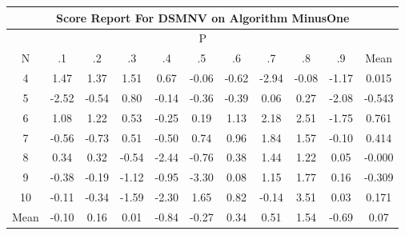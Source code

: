 \documentclass[11pt,a4paper]{report}
\begin{document}
\begin{longtable}{ | c || c | c | c | c | c | c | c | c | c || c |}
\hline
\multicolumn{11}{|c|}{ Score Report For DSMNV on Algorithm MinusOne} \\
\hline
\multicolumn{11}{|c|}{ P } \\
\hline
N & .1 & .2 & .3 & .4 & .5 & .6 & .7 & .8 & .9 & Mean\\
 \hline
 \hline
 \endhead
  4 &  \cellcolor[HTML]{D7D7FF} 1.47 &  \cellcolor[HTML]{DFDFFF} 1.37 &  \cellcolor[HTML]{D7D7FF} 1.51 &  \cellcolor[HTML]{EFEFFF} 0.67 &  \cellcolor[HTML]{FFFFFF} -0.06 &  \cellcolor[HTML]{FFEFEF} -0.62 &  \cellcolor[HTML]{FFB7B7} -2.94 &  \cellcolor[HTML]{FFFFFF} -0.08 &  \cellcolor[HTML]{FFDFDF} -1.17 & 0.015 \\
  5 &  \cellcolor[HTML]{FFBFBF} -2.52 &  \cellcolor[HTML]{FFEFEF} -0.54 &  \cellcolor[HTML]{E7E7FF} 0.80 &  \cellcolor[HTML]{FFFFFF} -0.14 &  \cellcolor[HTML]{FFF7F7} -0.36 &  \cellcolor[HTML]{FFF7F7} -0.39 &  \cellcolor[HTML]{FFFFFF} 0.06 &  \cellcolor[HTML]{F7F7FF} 0.27 &  \cellcolor[HTML]{FFC7C7} -2.08 & -0.543 \\
  6 &  \cellcolor[HTML]{E7E7FF} 1.08 &  \cellcolor[HTML]{DFDFFF} 1.22 &  \cellcolor[HTML]{EFEFFF} 0.53 &  \cellcolor[HTML]{FFF7F7} -0.25 &  \cellcolor[HTML]{F7F7FF} 0.19 &  \cellcolor[HTML]{DFDFFF} 1.13 &  \cellcolor[HTML]{C7C7FF} 2.18 &  \cellcolor[HTML]{BFBFFF} 2.51 &  \cellcolor[HTML]{FFCFCF} -1.75 & 0.761 \\
  7 &  \cellcolor[HTML]{FFEFEF} -0.56 &  \cellcolor[HTML]{FFEFEF} -0.73 &  \cellcolor[HTML]{EFEFFF} 0.51 &  \cellcolor[HTML]{FFEFEF} -0.50 &  \cellcolor[HTML]{EFEFFF} 0.74 &  \cellcolor[HTML]{E7E7FF} 0.96 &  \cellcolor[HTML]{CFCFFF} 1.84 &  \cellcolor[HTML]{D7D7FF} 1.57 &  \cellcolor[HTML]{FFFFFF} -0.10 & 0.414 \\
  8 &  \cellcolor[HTML]{F7F7FF} 0.34 &  \cellcolor[HTML]{F7F7FF} 0.32 &  \cellcolor[HTML]{FFEFEF} -0.54 &  \cellcolor[HTML]{FFBFBF} -2.44 &  \cellcolor[HTML]{FFEFEF} -0.76 &  \cellcolor[HTML]{F7F7FF} 0.38 &  \cellcolor[HTML]{D7D7FF} 1.44 &  \cellcolor[HTML]{DFDFFF} 1.22 &  \cellcolor[HTML]{FFFFFF} 0.05 & -0.000 \\
  9 &  \cellcolor[HTML]{FFF7F7} -0.38 &  \cellcolor[HTML]{FFF7F7} -0.19 &  \cellcolor[HTML]{FFDFDF} -1.12 &  \cellcolor[HTML]{FFE7E7} -0.95 &  \cellcolor[HTML]{FFAFAF} -3.30 &  \cellcolor[HTML]{FFFFFF} 0.08 &  \cellcolor[HTML]{DFDFFF} 1.15 &  \cellcolor[HTML]{CFCFFF} 1.77 &  \cellcolor[HTML]{F7F7FF} 0.16 & -0.309 \\
  10 &  \cellcolor[HTML]{FFFFFF} -0.11 &  \cellcolor[HTML]{FFF7F7} -0.34 &  \cellcolor[HTML]{FFD7D7} -1.59 &  \cellcolor[HTML]{FFC7C7} -2.30 &  \cellcolor[HTML]{D7D7FF} 1.65 &  \cellcolor[HTML]{E7E7FF} 0.82 &  \cellcolor[HTML]{FFFFFF} -0.14 &  \cellcolor[HTML]{A7A7FF} 3.51 &  \cellcolor[HTML]{FFFFFF} 0.03 & 0.171 \\
 \hline
 \hline
Mean &  \cellcolor[HTML]{FFFFFF} -0.10 &  \cellcolor[HTML]{FFFFFF} 0.16 &  \cellcolor[HTML]{FFFFFF} 0.01 &  \cellcolor[HTML]{FFE7E7} -0.84 &  \cellcolor[HTML]{FFF7F7} -0.27 &  \cellcolor[HTML]{F7F7FF} 0.34 &  \cellcolor[HTML]{EFEFFF} 0.51 &  \cellcolor[HTML]{D7D7FF} 1.54 &  \cellcolor[HTML]{FFEFEF} -0.69 &  \cellcolor[HTML]{FFFFFF} 0.07
\end{longtable}
\end{document}
